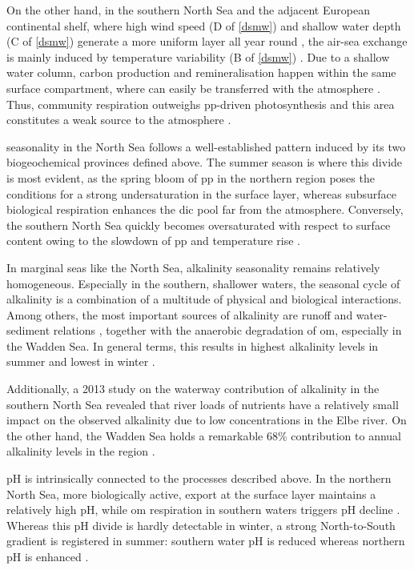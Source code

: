 On the other hand, in the southern North Sea and the adjacent European continental shelf, where high wind speed (D of \cref{dsmw}) and shallow water depth (C of \cref{dsmw}) generate a more uniform layer all year round \citep{thomas2009enhanced}, the air-sea  exchange is mainly induced by temperature variability (B of \cref{dsmw}) \citep{salt2013variability}. Due to a shallow water column, carbon production and remineralisation happen within the same surface compartment, where  can easily be transferred with the atmosphere \citep{prowe2009mechanisms, thomas2004enhanced}. Thus, community respiration outweighs \ac{pp}-driven photosynthesis \citep{artioli2012carbonate} and this area constitutes a weak  source to the atmosphere \citep{prowe2009mechanisms}. 

 seasonality in the North Sea follows a well-established pattern induced by its two biogeochemical provinces defined above. The summer season is where this divide is most evident, as the spring bloom of \ac{pp} in the northern region poses the conditions for a strong  undersaturation in the surface layer, whereas subsurface biological respiration enhances the \ac{dic} pool far from the atmosphere. Conversely, the southern North Sea quickly becomes oversaturated with respect to surface  content owing to the slowdown of \ac{pp} and temperature rise \citep{thomas2004enhanced}. 

In marginal seas like the North Sea, alkalinity seasonality remains relatively homogeneous. Especially in the southern, shallower waters, the seasonal cycle of alkalinity is a combination of a multitude of physical and biological interactions. Among others, the most important sources of alkalinity are runoff and water-sediment relations \citep{omar2010spatiotemporal}, together with the anaerobic degradation of \ac{om}, especially in the Wadden Sea. In general terms, this results in highest alkalinity levels in summer and lowest in winter \citep{thomas2009enhanced}. 

Additionally, a 2013 study on the waterway contribution of alkalinity in the southern North Sea revealed that river loads of nutrients have a relatively small impact on the observed alkalinity due to low concentrations in the Elbe river. On the other hand, the Wadden Sea holds a remarkable 68\% contribution to annual alkalinity levels in the region \citep{schwichtenberg2013drivers}. 

pH is intrinsically connected to the processes described above. In the northern North Sea, more biologically active,  export at the surface layer maintains a relatively high pH, while \ac{om} respiration in southern waters triggers pH decline \citep{salt2013variability, thomas2004enhanced}. Whereas this pH divide is hardly detectable in winter, a strong North-to-South gradient is registered in summer: southern water pH is reduced whereas northern pH is enhanced \citep{thomas2009enhanced}. 

